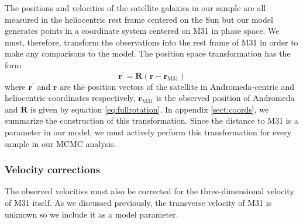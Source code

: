 \documentclass[preprint]{aastex}
\newcommand{\eq}[1]{equation \ref{eq:#1}}
\newcommand{\bvec}[1]{\ensuremath{\boldsymbol{#1}}}
\begin{document}
The positions and velocities of the satellite galaxies in our sample are all
measured in the heliocentric rest frame centered on the Sun but our model generates
points in a coordinate system centered on M31 in phase space. We must, therefore,
transform the observations into the rest frame of M31 in order to make any
comparisons to the model. The position space transformation has the form
\citep{Metz:2007}
\begin{equation}
    \bvec{r^\prime} = \bvec{R} (\bvec{r} - \bvec{r_\mathrm{M31}})
\end{equation}
where \bvec{r^\prime} and \bvec{r} are the position vectors of the satellite in
Andromeda-centric and heliocentric coordinates respectively, \bvec{r_\mathrm{M31}}
is the observed position of Andromeda and \bvec{R} is given by \eq{fullrotation}.
In appendix \ref{sect:coords}, we summarize the construction of this
transformation. Since the distance to M31 is a parameter in our model, we must
actively perform this transformation for every sample in our MCMC analysis.

\subsubsection{Velocity corrections}

The observed velocities must also be corrected for the three-dimensional velocity
of M31 itself. As we discussed previously, the transverse velocity of M31 is unknown
so we include it as a model parameter.
\end{document}

